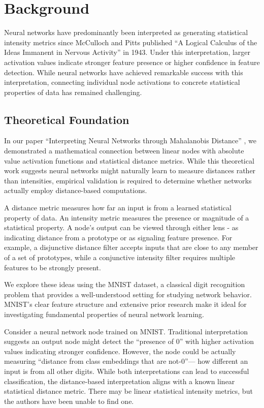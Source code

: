 \section{Background}

Neural networks have predominantly been interpreted as generating statistical intensity metrics since McCulloch and Pitts published ``A Logical Calculus of the Ideas Immanent in Nervous Activity'' in 1943. Under this interpretation, larger activation values indicate stronger feature presence or higher confidence in feature detection. While neural networks have achieved remarkable success with this interpretation, connecting individual node activations to concrete statistical properties of data has remained challenging.

\subsection{Theoretical Foundation}

In our paper ``Interpreting Neural Networks through Mahalanobis Distance'' \citep{oursland2024interpreting}, we demonstrated a mathematical connection between linear nodes with absolute value activation functions and statistical distance metrics. While this theoretical work suggests neural networks might naturally learn to measure distances rather than intensities, empirical validation is required to determine whether networks actually employ distance-based computations.

A distance metric measures how far an input is from a learned statistical property of data. An intensity metric measures the presence or magnitude of a statistical property. A node's output can be viewed through either lens - as indicating distance from a prototype or as signaling feature presence. For example, a disjunctive distance filter accepts inputs that are close to any member of a set of prototypes, while a conjunctive intensity filter requires multiple features to be strongly present.

We explore these ideas using the MNIST dataset, a classical digit recognition problem that provides a well-understood setting for studying network behavior. MNIST's clear feature structure and extensive prior research make it ideal for investigating fundamental properties of neural network learning.

Consider a neural network node trained on MNIST. Traditional interpretation suggests an output node might detect the ``presence of 0'' with higher activation values indicating stronger confidence. However, the node could be actually measuring ``distance from class embeddings that are not-0''--- how different an input is from all other digits. While both interpretations can lead to successful classification, the distance-based interpretation aligns with a known linear statistical distance metric. There may be linear statistical intensity metrics, but the authors have been unable to find one.

